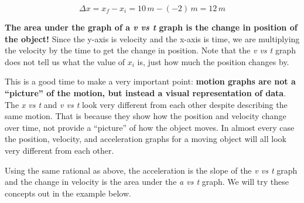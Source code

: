 \documentclass[12pt]{book}
\begin{document}
\begin{equation}
\Delta x = x_f - x_i = 10 \, m - (-2) \, m = 12 \, m
\end{equation}

\textbf{The area under the graph of a \textit{v vs t} graph is the change in position of the object!} Since the y-axis is velocity and the x-axis is time, we are multiplying the velocity by the time to get the change in position. Note that the \textit{v vs t} graph does not tell us what the value of $x_i$ is, just how much the position changes by.


This is a good time to make a very important point: \textbf{motion graphs are not a ``picture'' of the motion, but instead a visual representation of data}. The \textit{x vs t} and \textit{v vs t} look very different from each other despite describing the same motion. That is because they show how the position and velocity change over time, not provide a ``picture'' of how the object moves. In almost every case the position, velocity, and acceleration graphs for a moving object will all look very different from each other.

Using the same rational as above, the acceleration is the slope of the \textit{v vs t} graph and the change in velocity is the area under the \textit{a vs t} graph. We will try these concepts out in the example below.
\end{document}
